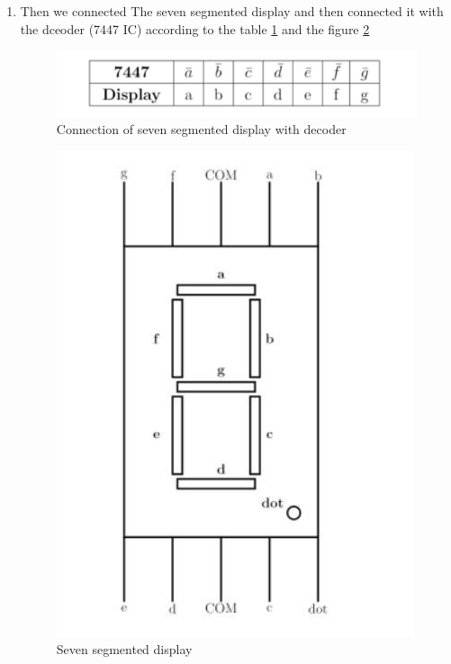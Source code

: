 \documentclass[journal,12pt,twocolumn]{IEEEtran}
\begin{document}
\begin{enumerate}
	\item Then we connected The seven segmented display and then connected it with the dceoder (7447 IC) according to the table \ref{table} and the figure \ref{SSD}
	\begin{figure}[h]
		\includegraphics[width=\linewidth]{images/7447_table.jpg}
		\caption{Connection of seven segmented display with decoder}
		\label{table}
	\end{figure}
	\begin{figure}[h]
		\includegraphics[width=\linewidth]{images/seven_segment_display.jpg}
		\caption{Seven segmented display}
		\label{SSD}
	\end{figure}


\end{enumerate}
\end{document}
